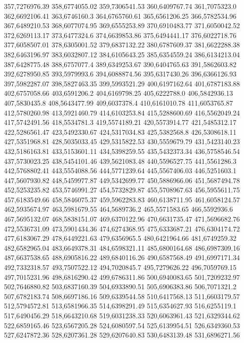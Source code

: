 357,7276976.39
358,6774055.02
359,7306541.53
360,6409767.74
361,7075323.0
362,6692106.41
363,6746160.3
364,6765760.61
365,6561206.25
366,5782534.96
367,6489210.53
368,6077074.95
369,6555253.89
370,6910483.77
371,6050042.52
372,6269113.17
373,6477324.6
374,6639853.86
375,6494441.17
376,6022718.76
377,6058507.01
378,6305001.52
379,6837132.22
380,6787609.37
381,6622288.38
382,6463196.97
383,6032807.12
384,6105643.25
385,6354559.24
386,6134213.04
387,6428775.48
388,6757077.4
389,6349253.67
390,6404765.63
391,5862603.82
392,6278950.85
393,5979993.6
394,6088874.56
395,6317430.26
396,6366126.93
397,5982287.07
398,5827463.35
399,5993521.29
400,6197162.64
401,6787183.88
402,6757058.66
403,6591206.2
404,6169798.25
405,6222788.0
406,5842936.13
407,5830435.8
408,5643477.99
409,6037378.4
410,6161010.78
411,6053765.87
412,5780260.98
413,5921460.79
414,6103253.84
415,5288600.69
416,5562049.24
417,5742491.56
418,5534781.3
419,5574189.21
420,5573914.77
421,5485312.17
422,5286561.47
423,5492330.67
424,5317034.83
425,5382568.8
426,5308618.11
427,5351968.81
428,5035033.45
429,5315822.53
430,5559679.79
431,5423140.23
432,5186163.81
433,5153601.11
434,5398259.55
435,5432373.34
436,5758546.54
437,5730023.25
438,5454101.46
439,5621083.48
440,5596527.75
441,5561286.3
442,5768802.41
443,5554088.56
444,5771239.64
445,5567406.03
446,5251603.1
447,5607930.82
448,5459977.87
449,5342699.77
450,5886966.06
451,5687494.78
452,5253235.82
453,5746991.27
454,5732829.87
455,5708967.63
456,5955611.75
457,6183549.66
458,5846075.37
459,5962283.83
460,6138711.95
461,6058124.57
462,5935674.97
463,5981679.55
464,5689736.2
465,5571583.65
466,5592936.6
467,5695132.07
468,5838151.07
469,6370122.96
470,6631735.47
471,5696682.76
472,5536731.09
473,5901434.36
474,6274368.95
475,6333687.21
476,6304174.72
477,6183067.29
478,6449221.63
479,6356965.5
480,6421964.66
481,6749259.32
482,6582965.04
483,6649378.31
484,6598321.11
485,6800164.68
486,6987309.16
487,6637538.65
488,6905816.22
489,6840116.26
490,6587568.49
491,6997171.34
492,7332318.57
493,7507522.12
494,7020845.7
495,7279626.22
496,7059769.15
497,7015231.96
498,6816290.42
499,6786311.86
500,6940083.65
501,7209232.97
502,7646880.82
503,6837160.39
504,6933890.51
505,6906383.86
506,7071321.2
507,6782183.74
508,6697186.16
509,6339544.58
510,6417568.13
511,6603179.57
512,5794572.81
513,6581966.35
514,6398291.49
515,6354627.93
516,6255119.1
517,6490456.29
518,6643210.68
519,6031238.33
520,6063961.43
521,6329344.62
522,6859165.46
523,6567205.28
524,6080597.54
525,6139954.51
526,6349360.53
527,6247872.36
528,6207361.28
529,6207640.83
530,6483139.48
531,6896271.56
